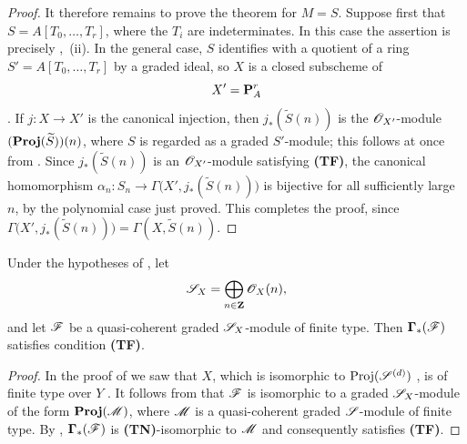\begin{proof}
It therefore remains to prove the theorem for $M=S$.
Suppose first that $S=A[T_0,\ldots,T_r]$,
where the $T_i$ are indeterminates.
In this case the assertion is precisely ,~(ii).
In the general case, $S$ identifies with a quotient of a ring $S'=A[T_0,\ldots,T_r]$
by a graded ideal, so $X$ is a closed subscheme of
\[
  X'=\mathbf{P}_A^r
\]
.
If $j:X\to X'$ is the canonical injection, then $j_*(\widetilde{S}(n))$ is the $\mathscr{O}_{X'}$-module $(\operatorname{\mathbf{Proj}}(\widetilde{S}))(n)$,
where $S$ is regarded as a graded $S'$-module; this follows at once from .
Since $j_*(\widetilde{S}(n))$ is an $\mathscr{O}_{X'}$-module satisfying \textbf{(TF)}, the canonical homomorphism $\alpha_n:S_n\longrightarrow
\Gamma\bigl(X',j_*(\widetilde{S}(n))\bigr)$
is bijective for all sufficiently large $n$, by the polynomial case just proved.
This completes the proof, since $\Gamma\bigl(X',j_*(\widetilde{S}(n))\bigr)
=\Gamma(X,\widetilde{S}(n))$.
\end{proof}

\begin{corollary}[2.3.2]
\label{III.2.3.2}
Under the hypotheses of , let
\[
  \mathscr{S}_X=\bigoplus_{n\in\mathbf{Z}}\mathscr{O}_X(n),
\]
and let $\mathscr{F}$ be a quasi-coherent graded $\mathscr{S}_X$-module of finite type.
Then $\boldsymbol{\Gamma}_*(\mathscr{F})$ satisfies condition \textup{\textbf{(TF)}}.
\end{corollary}

\begin{proof}
In the proof of  we saw that $X$, which is isomorphic to $\operatorname{Proj}(\mathscr{S}^{(d)})$ , is of finite type over $Y$ .
It follows from  that $\mathscr{F}$ is isomorphic to a graded $\mathscr{S}_X$-module of the form $\operatorname{\mathbf{Proj}}(\mathscr{M})$, where $\mathscr{M}$ is a quasi-coherent graded $\mathscr{S}$-module of finite type.
By , $\boldsymbol{\Gamma}_*(\mathscr{F})$ is \textbf{(TN)}-isomorphic to $\mathscr{M}$ and consequently satisfies \textbf{(TF)}.
\end{proof}

